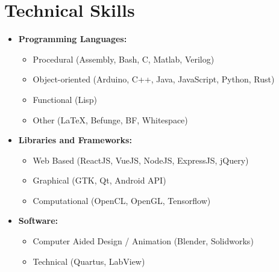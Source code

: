 \documentclass[10pt,letterpaper,sans]{moderncv}
\begin{document}
\section{Technical Skills}
\begin{itemize}
\item \textbf{Programming Languages:}
  \begin{itemize}
    \item Procedural (Assembly, Bash, C, Matlab, Verilog)
    \item Object-oriented (Arduino, C++, Java, JavaScript, Python, Rust)
    \item Functional (Lisp)
    \item Other (\LaTeX, Befunge, BF, Whitespace)
  \end{itemize}
\item \textbf{Libraries and Frameworks:} 
  \begin{itemize}
  \item Web Based (ReactJS, VueJS, NodeJS, ExpressJS, jQuery)
  \item Graphical (GTK, Qt, Android API)
  \item Computational (OpenCL, OpenGL, Tensorflow)
  \end{itemize}
\item \textbf{Software:} 
  \begin{itemize}
  \item Computer Aided Design / Animation (Blender, Solidworks)
  \item Technical (Quartus, LabView)
  \end{itemize}
\end{itemize}
\end{document}
